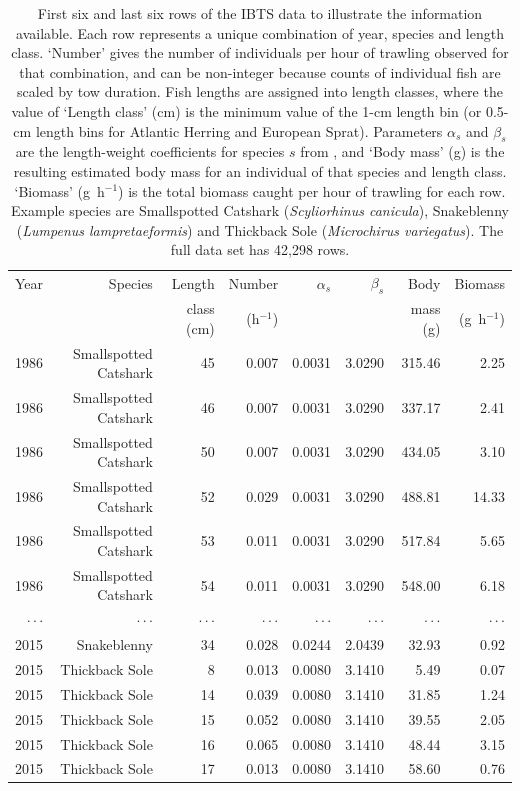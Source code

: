 \documentclass[12pt, letter]{article}
\begin{document}
\begin{table}[tp]
\centering
\caption{First six and last six rows of the IBTS data to illustrate the
  information available. Each row represents a unique combination of year,
  species and length class. `Number' gives the number of individuals per hour of
  trawling observed for that combination, and can be non-integer because counts
  of individual fish are scaled by tow duration. Fish lengths are assigned into
  length classes, where the value of `Length class' (cm) is the minimum value of
  the 1-cm length bin (or 0.5-cm length bins for Atlantic Herring and European
  Sprat). Parameters $\alpha_s$ and $\beta_s$ are the length-weight coefficients
  for species $s$ from \citet{ffrr12}, and `Body mass' (g) is the resulting
  estimated body mass for an individual of that species and length
  class. `Biomass' (g~h$^{-1}$) is the total biomass caught per hour of trawling
  for each row. Example species are Smallspotted Catshark ({\it Scyliorhinus
    canicula}), Snakeblenny ({\it Lumpenus lampretaeformis}) and Thickback Sole
  ({\it Microchirus variegatus}). The full data set has 42,298 rows.}
\label{tab:egData}
\begin{tabular}{rrrrrrrr}
  \hline
  Year & Species & Length & Number & $\alpha_s$ & $\beta_s$ & Body & Biomass\\
       & & class (cm) & (h$^{-1}$) & & & mass (g) & (g~h$^{-1}$) \\
  \hline
  1986 & Smallspotted Catshark & 45 & 0.007 & 0.0031 & 3.0290 & 315.46 & 2.25 \\
  1986 & Smallspotted Catshark & 46 & 0.007 & 0.0031 & 3.0290 & 337.17 & 2.41 \\
  1986 & Smallspotted Catshark & 50 & 0.007 & 0.0031 & 3.0290 & 434.05 & 3.10 \\
  1986 & Smallspotted Catshark & 52 & 0.029 & 0.0031 & 3.0290 & 488.81 & 14.33 \\
  1986 & Smallspotted Catshark & 53 & 0.011 & 0.0031 & 3.0290 & 517.84 & 5.65 \\
  1986 & Smallspotted Catshark & 54 & 0.011 & 0.0031 & 3.0290 & 548.00 & 6.18 \\
  $\cdot \cdot \cdot$ & $\cdot \cdot \cdot$ & $\cdot
  \cdot \cdot$ & $\cdot \cdot \cdot$ & $\cdot \cdot \cdot$ & $\cdot \cdot \cdot$
               & $\cdot \cdot \cdot$ & $\cdot \cdot \cdot$ \\
  2015 & Snakeblenny & 34 & 0.028 & 0.0244 & 2.0439 & 32.93 & 0.92 \\
  2015 & Thickback Sole & 8 & 0.013 & 0.0080 & 3.1410 & 5.49 & 0.07 \\
  2015 & Thickback Sole & 14 & 0.039 & 0.0080 & 3.1410 & 31.85 & 1.24 \\
  2015 & Thickback Sole & 15 & 0.052 & 0.0080 & 3.1410 & 39.55 & 2.05 \\
  2015 & Thickback Sole & 16 & 0.065 & 0.0080 & 3.1410 & 48.44 & 3.15 \\
  2015 & Thickback Sole & 17 & 0.013 & 0.0080 & 3.1410 & 58.60 & 0.76 \\
  \hline
\end{tabular}
\end{table}
\end{document}
